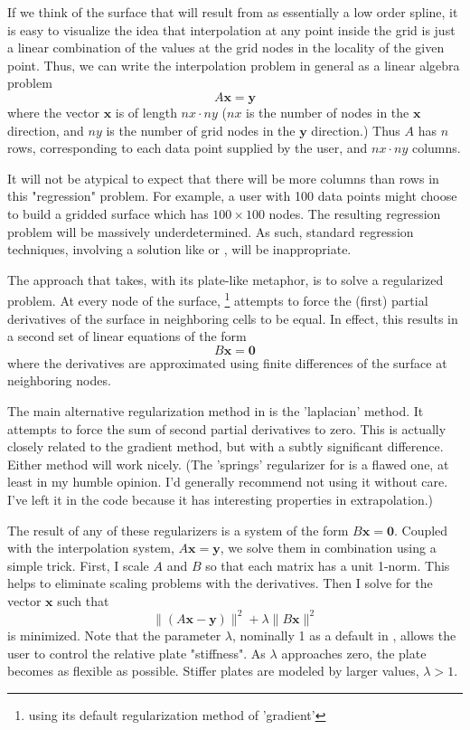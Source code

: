 \documentclass[a4paper,11pt]{article}
\newcommand{\G}{\mcode{GRIDFIT}}
\begin{document}
If we think of the surface that will result from \G{} as essentially
a low order spline, it is easy to visualize the idea that
interpolation at any point inside the grid is just a linear
combination of the values at the grid nodes in the locality of the
given point. Thus, we can write the interpolation problem in general
as a linear algebra problem
\begin{equation}
    A\mathbf{x}=\mathbf{y}
\end{equation}
where the vector $\mathbf{x}$ is of length $nx\cdot{}ny$ ($nx$ is
the number of nodes in the $\mathbf{x}$ direction, and $ny$ is the
number of grid nodes in the $\mathbf{y}$ direction.) Thus $A$ has
$n$ rows, corresponding to each data point supplied by the user, and
$nx\cdot{}ny$ columns.

It will not be atypical to expect that there will be more columns
than rows in this "regression" problem. For example, a user with 100
data points might choose to build a gridded surface which has
$100\times100$ nodes. The resulting regression problem will be
massively underdetermined. As such, standard regression techniques,
involving a solution like  or , will be inappropriate.

The approach that \G{} takes, with its plate-like metaphor, is to
solve a regularized problem. At every node of the surface,
\G{}\footnote{using its default regularization method of 'gradient'}
attempts to force the (first) partial derivatives of the surface in
neighboring cells to be equal. In effect, this results in a second
set of linear equations of the form
\begin{equation}
    B\mathbf{x} = \mathbf{0}
\end{equation}
where the derivatives are approximated using finite differences of
the surface at neighboring nodes.

The main alternative regularization method in \G{} is the
'laplacian' method. It attempts to force the sum of second partial
derivatives to zero. This is actually closely related to the
gradient method, but with a subtly significant difference. Either
method will work nicely. (The 'springs' regularizer for \G{} is a
flawed one, at least in my humble opinion. I'd generally recommend
not using it without care. I've left it in the code because it has
interesting properties in extrapolation.)

The result of any of these regularizers is a system of the form
$B\mathbf{x}=\mathbf{0}$. Coupled with the interpolation system,
$A\mathbf{x}=\mathbf{y}$, we solve them in combination using a
simple trick. First, I scale $A$ and $B$ so that each matrix has a
unit 1-norm. This helps to eliminate scaling problems with the
derivatives. Then I solve for the vector $\mathbf{x}$ such that
\begin{equation}
    \|(A\mathbf{x}-\mathbf{y})\|^2 + \lambda\|B\mathbf{x}\|^2
\end{equation}
is minimized. Note that the parameter $\lambda$, nominally 1 as a
default in \G, allows the user to control the relative plate
"stiffness". As $\lambda$ approaches zero, the plate becomes as
flexible as possible. Stiffer plates are modeled by larger values,
$\lambda>1$.
\end{document}
